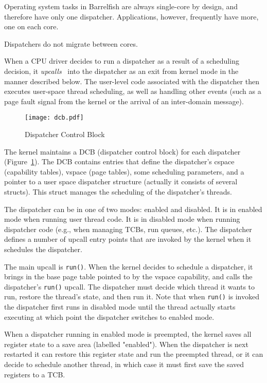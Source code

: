 \documentclass[a4paper,twoside]{report} %
\begin{document}
Operating system tasks in Barrelfish are always single-core by design,
and therefore have only one dispatcher.  Applications, however,
frequently have more, one on each core. 

Dispatchers do not migrate between cores. 

When a CPU driver decides to run a dispatcher as a result of a
scheduling decision, it
\emph{upcalls}~\cite{Clark:1985:SSU:323647.323645} into the dispatcher
as an exit from kernel mode in the manner described below.  The
user-level code associated with the dispatcher then executes
user-space thread scheduling, as well as handling other events (such
as a page fault signal from the kernel or the arrival of an
inter-domain message). 

\begin{figure}[hbt]
 \begin{center}
 \texttt{[image: dcb.pdf]}
 \end{center}
 \caption{Dispatcher Control Block}\label{fig:dcb}
\end{figure}

The kernel maintains a DCB (dispatcher control block) for each dispatcher
(Figure~\ref{fig:dcb}). The DCB contains entries that define the dispatcher's
cspace (capability tables), vspace (page tables), some scheduling parameters,
and a pointer to a user space dispatcher structure (actually it consists of
several structs). This struct manages the scheduling of the dispatcher's
threads.

The dispatcher can be in one of two modes: enabled and disabled. It is in
enabled mode when running user thread code. It is in disabled mode when running
dispatcher code (e.g., when managing TCBs, run queues, etc.). The dispatcher
defines a number of upcall entry points that are invoked by the kernel when it
schedules the dispatcher.

The main upcall is \texttt{run()}.  When the kernel decides to schedule a
dispatcher, it brings in the base page table pointed to by the vspace
capability, and calls the dispatcher's \texttt{run()} upcall.  The dispatcher
must decide which thread it wants to run, restore the thread's state, and then
run it. Note that when \texttt{run()} is invoked the dispatcher first runs in
disabled mode until the thread actually starts executing at which point the
dispatcher switches to enabled mode.

When a dispatcher running in enabled mode is preempted, the kernel saves all
register state to a save area (labelled "enabled"). When the dispatcher is next
restarted it can restore this register state and run the preempted thread, or it
can decide to schedule another thread, in which case it must first save the
saved registers to a TCB.  
\end{document}
